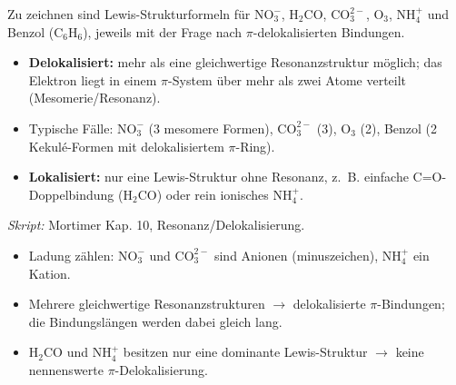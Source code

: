 

Zu zeichnen sind Lewis-Strukturformeln f\"ur $\mathrm{NO_3^-}$,
$\mathrm{H_2CO}$, $\mathrm{CO_3^{2-}}$, $\mathrm{O_3}$, $\mathrm{NH_4^+}$
und Benzol ($\mathrm{C_6H_6}$), jeweils mit der Frage nach
$\pi$-delokalisierten Bindungen.

\begin{werkzeugkasten}
\begin{itemize}
  \item \textbf{Delokalisiert:} mehr als eine gleichwertige
        Resonanzstruktur m\"oglich; das Elektron liegt in einem
        $\pi$-System \"uber mehr als zwei Atome verteilt
        (Mesomerie/Resonanz).
  \item Typische F\"alle: $\mathrm{NO_3^-}$ (3 mesomere Formen),
        $\mathrm{CO_3^{2-}}$ (3), $\mathrm{O_3}$ (2), Benzol (2
        Kekul\'e-Formen mit delokalisiertem $\pi$-Ring).
  \item \textbf{Lokalisiert:} nur eine Lewis-Struktur ohne
        Resonanz, z.~B. einfache C=O-Doppelbindung ($\mathrm{H_2CO}$) oder
        rein ionisches $\mathrm{NH_4^+}$.
\end{itemize}
\textit{Skript:} Mortimer Kap. 10, Resonanz/Delokalisierung.
\end{werkzeugkasten}

\begin{achtung}
\begin{itemize}
  \item Ladung z\"ahlen: $\mathrm{NO_3^-}$ und $\mathrm{CO_3^{2-}}$ sind
        Anionen (minuszeichen), $\mathrm{NH_4^+}$ ein Kation.
  \item Mehrere gleichwertige Resonanzstrukturen $\rightarrow$
        delokalisierte $\pi$-Bindungen; die Bindungsl\"angen werden dabei
        gleich lang.
  \item $\mathrm{H_2CO}$ und $\mathrm{NH_4^+}$ besitzen nur eine
        dominante Lewis-Struktur $\rightarrow$ keine nennenswerte
        $\pi$-Delokalisierung.
\end{itemize}
\end{achtung}
